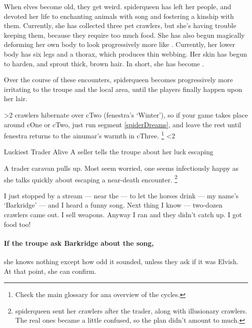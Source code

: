 \label{spiderSong}

\noindent
When elves become old, they get weird.
\Gls{spiderqueen} has left her people, and devoted her life to enchanting animals with song and fostering a kinship with them.
Currently, she has collected three pet \glspl{crawler}, but she's having trouble keeping them, because they require too much food.
She has also begun magically deforming her own body to look progressively more like .
Currently, her lower body has six legs and a thorax, which produces thin webbing.
Her skin has begun to harden, and sprout thick, brown hair.
In short, she has become .

Over the course of these encounters, \gls{spiderqueen} becomes progressively more irritating to the troupe and the local area, until the players finally happen upon her lair.

\ifnum\value{cycle}>2
  \Glspl{crawler} hibernate over \gls{cTwo} (\gls{fenestra}'s `Winter'), so if your game takes place around \gls{cOne} or \gls{cTwo}, just run \gls{segment} \ref{spiderDreams}, and leave the rest until \gls{fenestra} returns to the \gls{ainumar}'s warmth in \gls{cThree}.%
  \footnote{Check the main glossary  for ana overview of the \glspl{cycle}.}
\else
  \ifnum\value{cycle}<2
    
  \fi
\fi

{Luckiest Trader Alive}%
{A seller tells the troupe about her luck escaping }%
\label{spiderPt2}

\begin{boxtext}
  A trader caravan pulls up.
  Most seem worried, one seems infectiously happy as she talks quickly about escaping a near-death encounter.%
  \footnote{\Gls{spiderqueen} sent her \glspl{crawler} after the trader, along with illusionary \glspl{crawler}.
  The real ones became a little confused, so the plan didn't amount to much.}

  \begin{speechtext}
  I just stopped by a stream --- near the  --- to let the horses drink --- my name's `Barkridge' --- and I heard a funny song.
  Next thing I know --- two-dozen \glspl{crawler} came out.
  I sell \glspl{weapon}.
  Anyway I ran and they didn't catch up.
  I got food too!
  \end{speechtext}
\end{boxtext}

\paragraph{If the troupe ask Barkridge about the song,}
she knows nothing except how odd it sounded, unless they ask if it was Elvish.
At that point, she can confirm.

